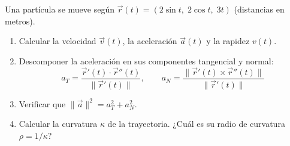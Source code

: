 Una partícula se mueve según $\vec{r}(t) = (2\sin t,\; 2\cos t,\; 3t)$ (distancias en metros).
\begin{enumerate}
    \item Calcular la velocidad $\vec{v}(t)$, la aceleración $\vec{a}(t)$ y la rapidez $v(t)$.
    \item Descomponer la aceleración en sus componentes tangencial y normal:
    \[ a_T = \frac{\vec{r}'(t)\cdot\vec{r}''(t)}{\|\vec{r}'(t)\|}, \qquad a_N = \frac{\|\vec{r}'(t)\times\vec{r}''(t)\|}{\|\vec{r}'(t)\|} \]
    \item Verificar que $\|\vec{a}\|^2 = a_T^2 + a_N^2$.
    \item Calcular la curvatura $\kappa$ de la trayectoria. ¿Cuál es su radio de curvatura $\rho = 1/\kappa$?
\end{enumerate}